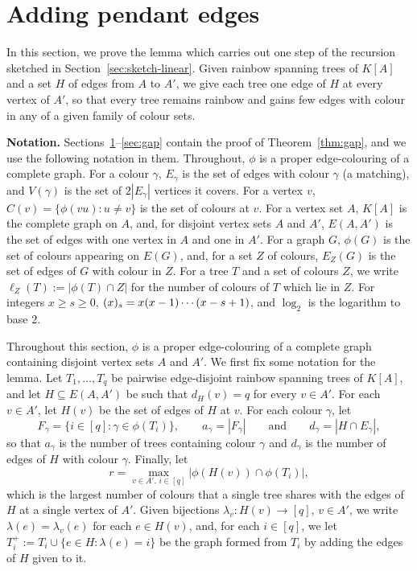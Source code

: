 \section{Adding pendant edges}\label{sec:pendant}
In this section, we prove the lemma which carries out one step of the recursion sketched in Section~\ref{sec:sketch-linear}.
Given rainbow spanning trees of $K[A]$ and a set $H$ of edges from $A$ to $A'$, we give each tree one edge of $H$ at every vertex of $A'$, so that every tree remains rainbow and gains few edges with colour in any of a given family of colour sets.

\smallskip

\noindent\textbf{Notation.} Sections~\ref{sec:pendant}--\ref{sec:gap} contain the proof of Theorem~\ref{thm:gap}, and we use the following notation in them. Throughout, $\phi$ is a proper edge-colouring of a complete graph.
For a colour $\gamma$, $E_\gamma$ is the set of edges with colour $\gamma$ (a matching), and $V(\gamma)$ is the set of $2|E_\gamma|$ vertices it covers.
For a vertex $v$, $C(v)=\{\phi(vu):u\neq v\}$ is the set of colours at $v$.
For a vertex set $A$, $K[A]$ is the complete graph on $A$, and, for disjoint vertex sets $A$ and $A'$, $E(A,A')$ is the set of edges with one vertex in $A$ and one in $A'$.
For a graph $G$, $\phi(G)$ is the set of colours appearing on $E(G)$, and, for a set $Z$ of colours, $E_Z(G)$ is the set of edges of $G$ with colour in $Z$.
For a tree $T$ and a set of colours $Z$, we write $\ell_Z(T):=|\phi(T)\cap Z|$ for the number of colours of $T$ which lie in $Z$.
For integers $x\geq s\geq 0$, $(x)_{s}=x(x-1)\cdots(x-s+1)$, and $\log_2$ is the logarithm to base $2$.

\smallskip

Throughout this section, $\phi$ is a proper edge-colouring of a complete graph containing disjoint vertex sets $A$ and $A'$.
We first fix some notation for the lemma. Let $T_1,\dots,T_q$ be pairwise edge-disjoint rainbow spanning trees of $K[A]$, and let $H\subseteq E(A,A')$ be such that $d_H(v)=q$ for every $v\in A'$. For each $v\in A'$, let $H(v)$ be the set of edges of $H$ at $v$.
For each colour $\gamma$, let
\[
F_\gamma=\{i\in [q]:\gamma\in\phi(T_i)\},\qquad a_\gamma=|F_\gamma|\qquad\text{and}\qquad d_\gamma=|H\cap E_\gamma|,
\]
so that $a_\gamma$ is the number of trees containing colour $\gamma$ and $d_\gamma$ is the number of edges of $H$ with colour $\gamma$. Finally, let
\[
r=\max_{v\in A',\,i\in[q]}\bigl|\phi(H(v))\cap\phi(T_i)\bigr|,
\]
which is the largest number of colours that a single tree shares with the edges of $H$ at a single vertex of $A'$.
Given bijections $\lambda_v:H(v)\to[q]$, $v\in A'$, we write $\lambda(e)=\lambda_v(e)$ for each $e\in H(v)$, and, for each $i\in [q]$, we let $T_i^+:=T_i\cup\{e\in H:\lambda(e)=i\}$ be the graph formed from $T_i$ by adding the edges of $H$ given to it.

